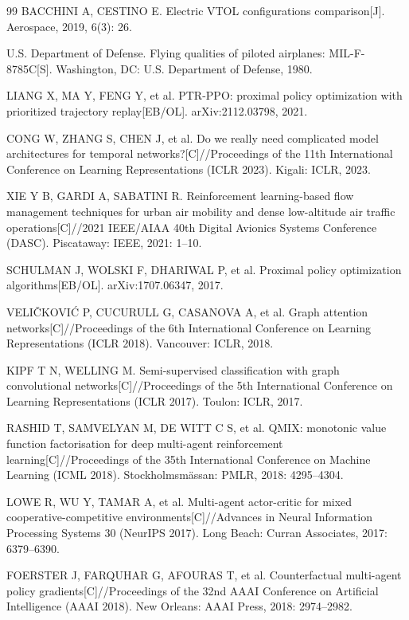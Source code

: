 \documentclass[12pt,a4paper,UTF8]{ctexbook}
\begin{document}
\begin{thebibliography}{99}
 BACCHINI A, CESTINO E. Electric VTOL configurations comparison[J]. Aerospace, 2019, 6(3): 26.

 U.S. Department of Defense. Flying qualities of piloted airplanes: MIL-F-8785C[S]. Washington, DC: U.S. Department of Defense, 1980.

 LIANG X, MA Y, FENG Y, et al. PTR-PPO: proximal policy optimization with prioritized trajectory replay[EB/OL]. arXiv:2112.03798, 2021.

 CONG W, ZHANG S, CHEN J, et al. Do we really need complicated model architectures for temporal networks?[C]//Proceedings of the 11th International Conference on Learning Representations (ICLR 2023). Kigali: ICLR, 2023.

 XIE Y B, GARDI A, SABATINI R. Reinforcement learning-based flow management techniques for urban air mobility and dense low-altitude air traffic operations[C]//2021 IEEE/AIAA 40th Digital Avionics Systems Conference (DASC). Piscataway: IEEE, 2021: 1--10.

 SCHULMAN J, WOLSKI F, DHARIWAL P, et al. Proximal policy optimization algorithms[EB/OL]. arXiv:1707.06347, 2017.

 VELI\v{C}KOVI\'C P, CUCURULL G, CASANOVA A, et al. Graph attention networks[C]//Proceedings of the 6th International Conference on Learning Representations (ICLR 2018). Vancouver: ICLR, 2018.

 KIPF T N, WELLING M. Semi-supervised classification with graph convolutional networks[C]//Proceedings of the 5th International Conference on Learning Representations (ICLR 2017). Toulon: ICLR, 2017.

 RASHID T, SAMVELYAN M, DE WITT C S, et al. QMIX: monotonic value function factorisation for deep multi-agent reinforcement learning[C]//Proceedings of the 35th International Conference on Machine Learning (ICML 2018). Stockholmsm\"{a}ssan: PMLR, 2018: 4295--4304.

 LOWE R, WU Y, TAMAR A, et al. Multi-agent actor-critic for mixed cooperative-competitive environments[C]//Advances in Neural Information Processing Systems 30 (NeurIPS 2017). Long Beach: Curran Associates, 2017: 6379--6390.

 FOERSTER J, FARQUHAR G, AFOURAS T, et al. Counterfactual multi-agent policy gradients[C]//Proceedings of the 32nd AAAI Conference on Artificial Intelligence (AAAI 2018). New Orleans: AAAI Press, 2018: 2974--2982.


\end{thebibliography}
\end{document}
